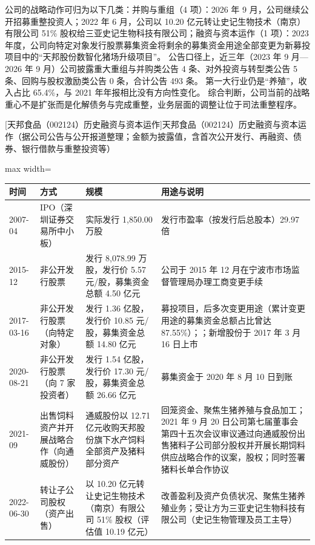  公司的战略动作可归为以下几类：并购与重组（4 项）：2026 年 9 月，公司继续公开招募重整投资人；2022 年 6 月，公司以 10.20 亿元转让史记生物技术（南京）有限公司 51\% 股权给三亚史记生物科技有限公司；融资与资本运作（1 项）：2023 年度，公司向特定对象发行股票募集资金将剩余的募集资金用途全部变更为新募投项目中的“天邦股份数智化猪场升级项目”。 公告口径上，近三年（2023 年 9 月---2026 年 9 月）公司披露重大重组与并购类公告 4 条、对外投资与转型类公告 5 条、回购与股权激励类公告 0 条，合计公告 493 条。 第一大行业仍是“养殖”，收入占比 65.4\%，与 2021 年年报相比没有方向性变化。 综合判断，公司当前的战略重心不是扩张而是化解债务与完成重整，业务层面的调整让位于司法重整程序。

\begin{center}\small\setlength{\tabcolsep}{4pt}
[天邦食品（002124）历史融资与资本运作]{天邦食品（002124）历史融资与资本运作（据公司公告与公开报道整理；金额为披露值，含首次公开发行、再融资、债券、银行借款与重整投资等）}
\begin{adjustbox}{max width=\textwidth}
\begin{tabular}{@{}p{1.45cm}p{2.55cm}p{4.05cm}p{4.95cm}@{}}
\toprule
时间 & 方式 & 规模 & 用途与说明 \\
\midrule
2007-04 & IPO（深圳证券交易所中小板） & 实际发行 1,\allowbreak{}850.00 万股 & 发行市盈率（按发行后总股本）29.97 倍 \\
2015-12 & 非公开发行股票 & 发行 8,\allowbreak{}078.99 万股，\allowbreak{}发行价 5.57 元/\allowbreak{}股，\allowbreak{}募集资金总额 4.50 亿元 & 公司于 2015 年 12 月在宁波市市场监督管理局办理工商变更手续 \\
2017-03-16 & 非公开发行股票（向特定对象） & 发行 1.36 亿股，\allowbreak{}发行价 10.85 元/\allowbreak{}股，\allowbreak{}募集资金总额 14.80 亿元 & 募投项目，\allowbreak{}后多次变更用途（累计变更用途的募集资金总额占比曾达 87.55\%）；；新增股份于 2017 年 3 月 16 日上市 \\
2020-08-21 & 非公开发行股票（向 7 家投资者） & 发行 1.54 亿股，\allowbreak{}发行价 17.30 元/\allowbreak{}股，\allowbreak{}募集资金总额 26.66 亿元 & 募集资金于 2020 年 8 月 10 日到账 \\
2021-09 & 出售饲料资产并开展战略合作（向通威股份） & 通威股份以 12.71 亿元收购天邦股份旗下水产饲料全部资产及猪料部分资产 & 回笼资金、\allowbreak{}聚焦生猪养殖与食品加工；2021 年 9 月 20 日公司第七届董事会第四十五次会议审议通过向通威股份出售猪料子公司部分股权并开展长期饲料供应战略合作的议案，\allowbreak{}股权；同时签署猪料长单合作协议 \\
2022-06-30 & 转让子公司股权（资产出售） & 以 10.20 亿元转让史记生物技术（南京）有限公司 51\% 股权（评估值 10.19 亿元） & 改善盈利及资产负债状况、\allowbreak{}聚焦生猪养殖业务；受让方为三亚史记生物科技有限公司（史记生物管理及员工主导） \\

\end{tabular}
\end{adjustbox}
\end{center}
